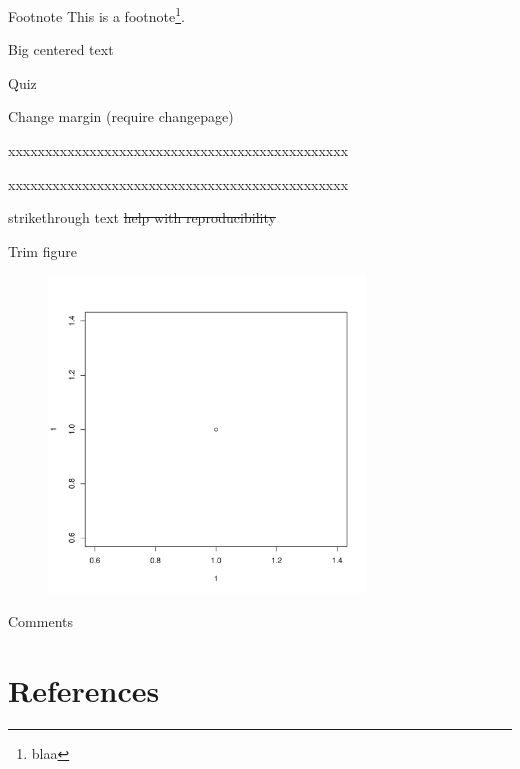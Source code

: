 \documentclass[table]{beamer}
\begin{document}
\begin{frame}[label={sec:orgef8f790}]{Footnote}
This is a footnote\footnote{blaa}.
\end{frame}
\begin{frame}[label={sec:org2696d7e}]{Big centered text}
\vfill

\begin{center}
\Huge Quiz
\end{center}

\vfill
\end{frame}

\begin{frame}[label={sec:org251a7cb}]{Change margin}
(require changepage)
\begin{adjustwidth}{-1em}{-1em}
xxxxxxxxxxxxxxxxxxxxxxxxxxxxxxxxxxxxxxxxxxxxxx
\end{adjustwidth}
\begin{adjustwidth}{-3em}{-3em}
xxxxxxxxxxxxxxxxxxxxxxxxxxxxxxxxxxxxxxxxxxxxxx
\end{adjustwidth}
\end{frame}
\begin{frame}[label={sec:orgfab36e3}]{strikethrough text}
\sout{help with reproducibility}
\end{frame}

\begin{frame}[label={sec:orgd7e43f7}]{Trim figure}
\begin{figure}[!h]
\centering
\includegraphics[trim={10mm 2mm 1mm 0mm},width=0.75\textwidth]{./figures/myplot.pdf}
\label{fig:1}
\end{figure}
\end{frame}

\begin{frame}[label={sec:orgbd6faf4}]{Comments}
\end{frame}

\section{References}
\label{sec:org20864db}
\begingroup
\renewcommand{\section}[2]{}



\endgroup
\end{document}
